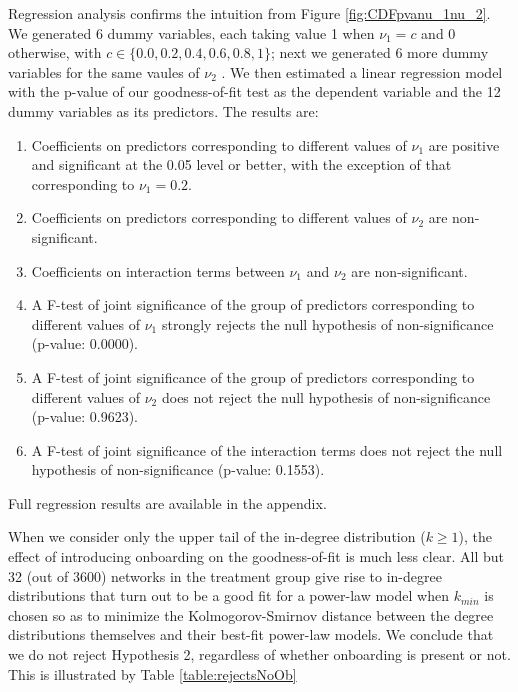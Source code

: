 \documentclass{nws}
\begin{document}
Regression analysis confirms the intuition from Figure \ref{fig:CDFpvanu_1nu_2}. We generated 6 dummy variables, each taking value 1 when $\nu_1 =  c$ and 0 otherwise, with $c \in \{0.0, 0.2, 0.4, 0.6, 0.8, 1\}$; next we generated 6 more dummy variables for the same vaules of $\nu_2$ . We then estimated a linear regression model with the p-value of our goodness-of-fit test as the dependent variable and the 12 dummy variables as its predictors. The results are:

\begin{enumerate}
\item Coefficients on predictors corresponding to different values of $\nu_1$ are positive and significant at the 0.05 level or better, with the exception of that corresponding to $\nu_1 = 0.2$.
\item Coefficients on predictors corresponding to different values of $\nu_2$ are non-significant.
\item Coefficients on interaction terms between $\nu_1$ and $\nu_2$ are non-significant.
\item A F-test of joint significance of the group of predictors corresponding to different values of $\nu_1$ strongly rejects the null hypothesis of non-significance (p-value: 0.0000).
\item A F-test of joint significance of the group of predictors corresponding to different values of $\nu_2$ does not reject the null hypothesis of non-significance (p-value: 0.9623).
\item A F-test of joint significance of the interaction terms does not reject the null hypothesis of non-significance (p-value: 0.1553).
\end{enumerate}

Full regression results are available in the appendix.

When we consider only the upper tail of the in-degree distribution ($k \geq 1$), the effect of introducing onboarding on the goodness-of-fit is much less clear. All but 32 (out of 3600) networks in the treatment group give rise to in-degree distributions that turn out to be a good fit for a power-law model when $k_{min}$ is chosen so as to minimize the Kolmogorov-Smirnov distance between the degree distributions themselves and their best-fit power-law models. We conclude that we do not reject Hypothesis 2, regardless of whether onboarding is present or not. This is illustrated by Table \ref{table:rejectsNoOb}
\end{document}
